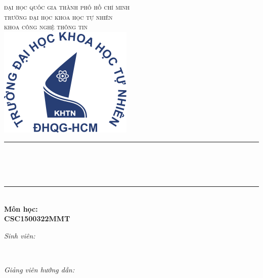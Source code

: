 \begin{titlepage}
\newcommand{\HRule}{\rule{\linewidth}{0.5mm}}
\centering

\textsc{\LARGE đại học quốc gia thành phố hồ chí minh}\\[0.8cm]
\textsc{\Large trường đại học khoa học tự nhiên}\\[0.4cm]
\textsc{\large khoa công nghệ thông tin}\\[1cm]
\includegraphics[scale=1.1]{img/hcmus-logo.png}\\[0.8cm] 
\HRule \\[0.4cm]
{ 
\Large{\bfseries{\reporttitle}}\\[0.4cm]
\huge{\bfseries{\reportname}}
}\\[0.4cm]
\HRule \\[0.4cm]

\textbf{\large Môn học: \coursename}\\[0.4cm]
\textbf{\large CSC15003\textunderscore22MMT} \\ [0.7cm]
\begin{minipage}[t]{0.4\textwidth}
\begin{flushleft} \large
\emph{Sinh viên:}\\
\studentname
\end{flushleft}
\end{minipage}
~
\begin{minipage}[t]{0.4\textwidth}
\begin{flushright} \large
\emph{Giảng viên hướng dẫn:} \\
\teachername
\end{flushright}
\end{minipage}\\[0.7cm]




\vfill
\end{titlepage}
	